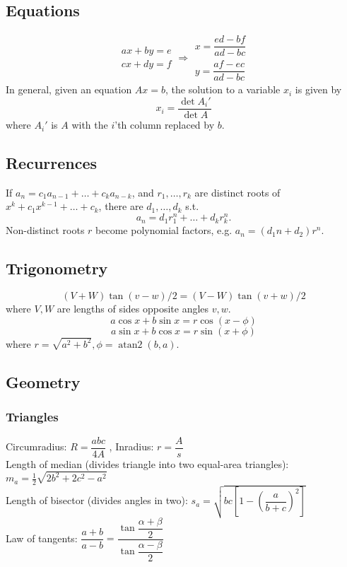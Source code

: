 \begin{small}

\subsection{Equations}

\[\begin{aligned}ax+by=e\\cx+dy=f\end{aligned}
\Rightarrow
\begin{aligned}x=\dfrac{ed-bf}{ad-bc}\\y=\dfrac{af-ec}{ad-bc}\end{aligned}\]
In general, given an equation $Ax = b$, the solution to a variable $x_i$ is given by
\[x_i = \frac{\det A_i'}{\det A} \]
where $A_i'$ is $A$ with the $i$'th column replaced by $b$.

\subsection{Recurrences}
If $a_n = c_1 a_{n-1} + \dots + c_k a_{n-k}$, and $r_1, \dots, r_k$ are distinct roots of $x^k + c_1 x^{k-1} + \dots + c_k$, there are $d_1, \dots, d_k$ s.t.
\[a_n = d_1r_1^n + \dots + d_kr_k^n. \]
Non-distinct roots $r$ become polynomial factors, e.g. $a_n = (d_1n + d_2)r^n$.

\subsection{Trigonometry}
\[ (V+W)\tan(v-w)/2{}=(V-W)\tan(v+w)/2 \]
where $V, W$ are lengths of sides opposite angles $v, w$.
\[a\cos x+b\sin x=r\cos(x-\phi)\]
\[a\sin x+b\cos x=r\sin(x+\phi)\]
where $r=\sqrt{a^2+b^2}, \phi=\operatorname{atan2}(b,a)$.

\subsection{Geometry}
\subsubsection{Triangles}
Circumradius: $R=\dfrac{abc}{4A}$ , Inradius: $r=\dfrac{A}{s}$\\
Length of median (divides triangle into two equal-area triangles): $m_a=\tfrac{1}{2}\sqrt{2b^2+2c^2-a^2}$\\
Length of bisector (divides angles in two): $s_a=\sqrt{bc\left[1-\left(\dfrac{a}{b+c}\right)^2\right]}$\\
Law of tangents: $\dfrac{a+b}{a-b}=\dfrac{\tan\dfrac{\alpha+\beta}{2}}{\tan\dfrac{\alpha-\beta}{2}}$\\

\end{small}
